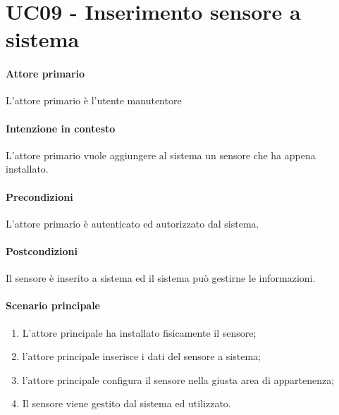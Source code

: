 \section{UC09 - Inserimento sensore a sistema}

\paragraph{Attore primario} L'attore primario è l'utente manutentore
\paragraph{Intenzione in contesto} L'attore primario vuole aggiungere al sistema un sensore che ha appena installato.

\paragraph{Precondizioni} L'attore primario è autenticato ed autorizzato dal sistema.

\paragraph{Postcondizioni} Il sensore è inserito a sistema ed il sistema può gestirne le informazioni.

\paragraph{Scenario principale}

\begin{enumerate}
    \item L'attore principale ha installato fisicamente il sensore;
    \item l'attore principale inserisce i dati del sensore a sistema;
    \item l'attore principale configura il sensore nella giusta area di appartenenza;
    \item Il sensore viene gestito dal sistema ed utilizzato.
\end{enumerate}
